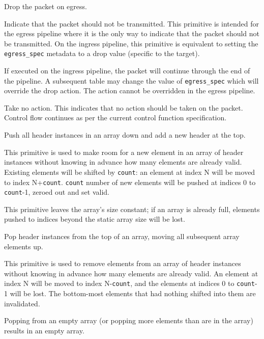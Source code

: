 \documentclass[12pt]{article}
\begin{document}

{ %
Drop the packet on egress.
}
{ %
}
{ %
Indicate that the packet should not be transmitted. This primitive is intended 
for the egress pipeline where it is the only way to indicate that the packet 
should not be transmitted. On the ingress pipeline, this primitive is equivalent 
to setting the \texttt{egress_spec} metadata to a drop value (specific to the target). 


If executed on the ingress pipeline, the packet will continue through the 
end of the pipeline. A subsequent table may change the value of \texttt{egress_spec} which 
will override the drop action. The action cannot be overridden in the egress 
pipeline.
}


{ %
Take no action.
}
{ %
}
{ %
This indicates that no action should be taken on the packet. Control flow 
continues as per the current control function specification. 
}


{ %
Push all header instances in an array down and add a new header at the top.
}
{ %
}
{ %
This primitive is used to make room for a new element in an array of header
instances without knowing in advance how many elements are already valid. 
{\color{red}Existing elements will be shifted by \texttt{count}: an
element at index N will be moved to index N+\texttt{count}. 
\texttt{count} number of new elements will be pushed at indices 0 to 
\texttt{count}-1, zeroed out and set valid.}

This primitive leaves the array's size constant; if an array is already full,
elements pushed to indices beyond the static array size will be lost.
}


{ %
Pop header instances from the top of an array, moving all subsequent array elements up.
}
{ %
}
{ %
This primitive is used to remove elements from an array of header instances
without knowing in advance how many elements are already valid. {\color{red}An element at
index N will be moved to index N-\texttt{count}, and the elements at indices 0 to 
\texttt{count}-1 will be lost. The
bottom-most elements that had nothing shifted into them are invalidated.}

Popping from an empty array (or popping more elements than are in the array)
results in an empty array.
}
\end{document}
